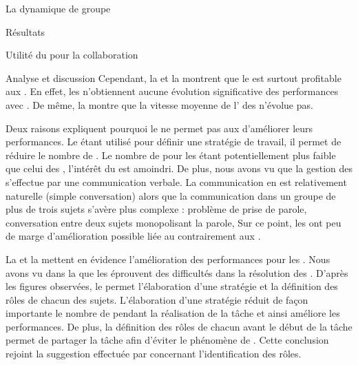 \documentclass[myfrancais,ngerman,english,french]{mythesis}
\begin{document}
\begin{mychapter}{La dynamique de groupe}
\begin{mysection}{Résultats}
\begin{mysubsection}{Utilité du \mybrainstorming pour la collaboration}
\begin{mysubsubsection}{Analyse et discussion}
					Cependant, la  et la  montrent que le \mybrainstorming est surtout profitable aux .
					En effet, les  n'obtiennent aucune évolution significative des performances avec \mybrainstorming.
					De même, la  montre que la vitesse moyenne de l' des  n'évolue pas.

					Deux raisons expliquent pourquoi le \mybrainstorming ne permet pas aux  d'améliorer leurs performances.
					Le \mybrainstorming étant utilisé pour définir une stratégie de travail, il permet de réduire le nombre de .
					Le nombre de  pour les  étant potentiellement plus faible que celui des , l'intérêt du \mybrainstorming est amoindri.
					De plus, nous avons vu que la gestion des  s'effectue par une communication verbale.
					La communication en  est relativement naturelle (simple conversation) alors que la communication dans un groupe de plus de trois sujets s'avère plus complexe : problème de prise de parole, conversation entre deux sujets monopolisant la parole, \myetc
					Sur ce point, les  ont peu de marge d'amélioration possible liée au \mybrainstorming contrairement aux .

					La  et la  mettent en évidence l'amélioration des performances pour les .
					Nous avons vu dans la  que les  éprouvent des difficultés dans la résolution des .
					D'après les figures observées, le \mybrainstorming permet l'élaboration d'une stratégie et la définition des rôles de chacun des sujets.
					L'élaboration d'une stratégie réduit de façon importante le nombre de  pendant la réalisation de la tâche et ainsi améliore les performances.
					De plus, la définition des rôles de chacun avant le début de la tâche permet de partager la tâche afin d'éviter le phénomène de .
					Cette conclusion rejoint la suggestion effectuée par  concernant l'identification des rôles.


\end{mysubsubsection}
\end{mysubsection}
\end{mysection}
\end{mychapter}
\end{document}
